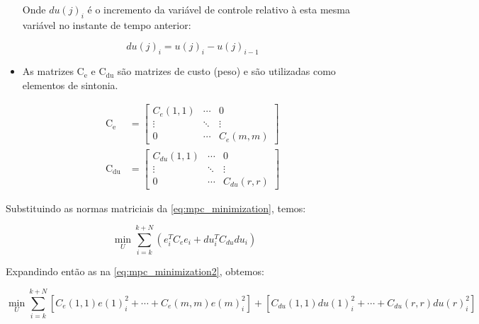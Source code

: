 \begin{itemize}
        Onde $du(j)_i$ é o incremento da variável de controle relativo à esta mesma variável no instante
        de tempo anterior:

        \begin{equation}
			du(j)_i = u(j)_i - u(j)_{i-1}
        \end{equation}
	
	\item As matrizes $\mathrm{C_e}$ e $\mathrm{C_{du}}$ são matrizes de custo (peso) e são utilizadas
        como elementos de sintonia.

        \begin{subequations}
            \label{eq:mpc_cost_matrix}
            \begin{align}
                \mathrm{C_e} &= 
                \begin{bmatrix}
                    C_e(1,1) & \cdots & 0   		\\
                    \vdots & \ddots & \vdots		\\
                    0 & \cdots & C_e(m,m)	
                \end{bmatrix}
                                                    \\
                \mathrm{C_{du}} &= 
                \begin{bmatrix}
                    C_{du}(1,1) & \cdots & 0   		\\
                    \vdots & \ddots & \vdots		\\
                    0 & \cdots & C_{du}(r,r)	
                \end{bmatrix}
            \end{align}
        \end{subequations}
	
\end{itemize}

Substituindo as normas matriciais da \cref{eq:mpc_minimization}, temos:

\begin{equation}
    \label{eq:mpc_minimization2}
    \min_{U} \sum_{i=k}^{k+N} ( e^T_i C_e e_i + du^T_i C_{du} du_i )
\end{equation}

Expandindo então as  na \cref{eq:mpc_minimization2},
obtemos:

\begin{equation}
    \label{eq:mpc_minimization3}
    \min_{U} \sum_{i=k}^{k+N} [C_e(1,1) e(1)^2_i + \cdots + C_e(m,m) e(m)^2_i] + 
                                [C_{du}(1,1) du(1)^2_i + \cdots + C_{du}(r,r) du(r)^2_i]
\end{equation}

